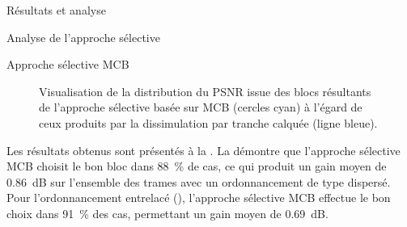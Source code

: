 \begin{chapter}{Résultats et analyse}
\begin{section}{Analyse de l'approche sélective}
\begin{subsection}{Approche sélective MCB}
\begin{figure}[htb]
\caption[PSNR issue des blocs résultants de l'approche sélective basée sur
MCB]{Visualisation de la distribution du PSNR issue des blocs résultants de
l'approche sélective basée sur MCB (cercles cyan) à l'égard de ceux produits par
la dissimulation par tranche calquée (ligne bleue).}
\label{fig-SelectiveSliceCopyBlocks}
\end{figure}

Les résultats obtenus sont présentés à la . La
 démontre que l'approche sélective MCB
choisit le bon bloc dans 88~\% de cas, ce qui produit un gain moyen de 0.86~dB
sur l'ensemble des trames avec un ordonnancement de type dispersé. Pour
l'ordonnancement entrelacé (),
l'approche sélective MCB effectue le bon choix dans 91~\% des cas, permettant un
gain moyen de 0.69~dB.


\end{subsection}
\end{section}
\end{chapter}
